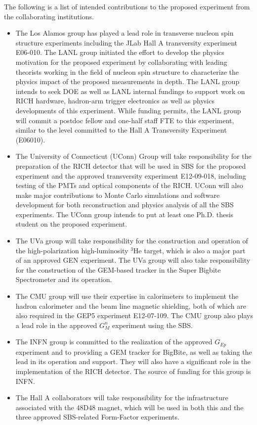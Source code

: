The following is a list of intended contributions to the proposed experiment from the collaborating institutions. 
\begin{itemize}  

\item The Los Alamos group has played a lead role
  in transverse nucleon spin structure experiments including the JLab Hall A
  transversity experiment E06-010. The LANL group initiated the effort to develop the physics motivation for the proposed experiment by collaborating with leading
  theorists working in the field of nucleon spin structure to characterize the physics
  impact of the proposed measurements in depth.  The LANL group intends to seek DOE as well as LANL internal fundings to support work on RICH hardware, hadron-arm trigger electronics as well as physics developments of this experiment.  While funding permits, the LANL group will commit a postdoc fellow and one-half staff FTE to this experiment, similar to the level committed to the Hall A Transversity Experiment (E06010).    

\item  The University of Connecticut (UConn) Group will take responsibility for the preparation of the RICH detector that will be used in SBS for the proposed experiment and the approved transversity experiment E12-09-018, including testing of the PMTs and optical components of the RICH. UConn will also make major contributions to Monte Carlo simulations and software development for both reconstruction and physics analysis of all the SBS experiments. The UConn group intends to put at least one Ph.D. thesis student on the proposed experiment.

\item The UVa group will take responsibility for the construction and operation
  of the high-polarization high-luminosity $^3$He target, which is also a major part
  of an approved GEN experiment.
  The UVa group will also take responsibility for the construction of the GEM-based tracker
  in the Super Bigbite Spectrometer and its operation. 

\item The CMU group will use their expertise in calorimeters to implement the hadron calorimeter
  and the beam line magnetic shielding, both of which are also required
  in the GEP5 experiment E12-07-109. The CMU group also plays a lead role in
  the approved $G_M^n$ experiment using the SBS.
  
\item The INFN group is committed to the realization of the approved $G_{Ep}$ experiment and 
  to providing a GEM tracker for BigBite, as well as taking the lead in its operation and support. 
  They will also have a significant role in the implementation of the RICH detector.   
  The source of funding for this group is INFN.

\item The Hall A collaborators will take responsibility for the infrastructure associated with
  the 48D48 magnet, which will be used in both this and the three
  approved SBS-related Form-Factor experiments.
\end{itemize}
